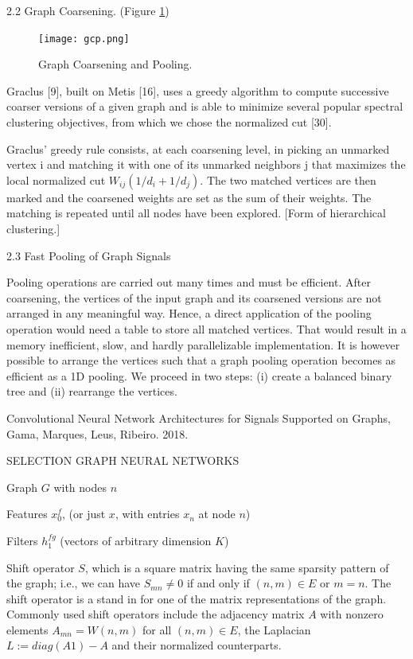 \documentclass[english]{article}
\begin{document}
\item 2.2 Graph Coarsening. (Figure \ref{gcp})

\begin{figure}
  \centering
  \texttt{[image: gcp.png]}
    \caption{Graph Coarsening and Pooling.}
    \label{gcp}
\end{figure}


Graclus [9], built on Metis [16], uses a greedy algorithm to compute successive coarser versions of a given graph and is able to minimize several popular spectral clustering objectives, from which we chose the normalized cut [30].

Graclus' greedy rule consists, at each coarsening level, in picking an
unmarked vertex i and matching it with one of its unmarked neighbors j that maximizes the local normalized cut $W_{ij} (1/d_i + 1/d_j)$. The two matched vertices are then marked and the coarsened weights are set as the sum of their weights. The matching is repeated until all nodes have been explored.  [Form of hierarchical clustering.]

\item 2.3 Fast Pooling of Graph Signals

Pooling operations are carried out many times and must be efficient. After coarsening, the vertices
of the input graph and its coarsened versions are not arranged in any meaningful way. Hence, a
direct application of the pooling operation would need a table to store all matched vertices. That
would result in a memory inefficient, slow, and hardly parallelizable implementation. It is however
possible to arrange the vertices such that a graph pooling operation becomes as efficient as a 1D
pooling. We proceed in two steps: (i) create a balanced binary tree and (ii) rearrange the vertices.

\eenum 

\item Convolutional Neural Network Architectures for
Signals Supported on Graphs, Gama, Marques, Leus, Ribeiro. 2018.

SELECTION GRAPH NEURAL NETWORKS

Graph $G$ with nodes $n$

Features $x_0^f$, (or just $x$, with entries $x_n$ at node $n$)

Filters $h_1^{fg}$ (vectors of arbitrary dimension $K$) 

Shift
operator $S$, which is a square matrix having the same
sparsity pattern of the graph; i.e., we can have $S_{mn}\neq 0$ if
and only if $(n,m) \in E$ or $m = n$. The shift operator is a
stand in for one of the matrix representations of the graph.
Commonly used shift operators include the adjacency matrix
$A$ with nonzero elements $A_{mn} = W(n,m)$ for all $(n,m) \in
E$, the Laplacian $L := diag(A1) - A$ and their normalized
counterparts.
\end{document}
